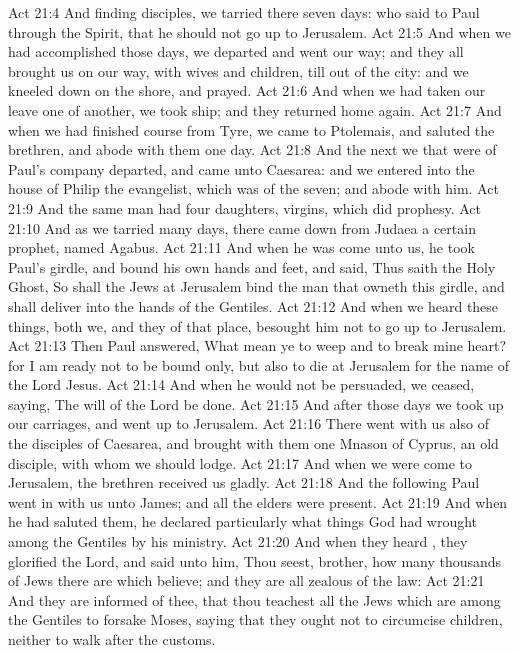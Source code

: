 \vs Act 21:4 And finding disciples, we tarried there seven days: who said to Paul through the Spirit, that he should not go up to Jerusalem.
\vs Act 21:5 And when we had accomplished those days, we departed and went our way; and they all brought us on our way, with wives and children, till  out of the city: and we kneeled down on the shore, and prayed.
\vs Act 21:6 And when we had taken our leave one of another, we took ship; and they returned home again.
\vs Act 21:7 And when we had finished  course from Tyre, we came to Ptolemais, and saluted the brethren, and abode with them one day.
\vs Act 21:8 And the next  we that were of Paul's company departed, and came unto Caesarea: and we entered into the house of Philip the evangelist, which was  of the seven; and abode with him.
\vs Act 21:9 And the same man had four daughters, virgins, which did prophesy.
\vs Act 21:10 And as we tarried  many days, there came down from Judaea a certain prophet, named Agabus.
\vs Act 21:11 And when he was come unto us, he took Paul's girdle, and bound his own hands and feet, and said, Thus saith the Holy Ghost, So shall the Jews at Jerusalem bind the man that owneth this girdle, and shall deliver  into the hands of the Gentiles.
\vs Act 21:12 And when we heard these things, both we, and they of that place, besought him not to go up to Jerusalem.
\vs Act 21:13 Then Paul answered, What mean ye to weep and to break mine heart? for I am ready not to be bound only, but also to die at Jerusalem for the name of the Lord Jesus.
\vs Act 21:14 And when he would not be persuaded, we ceased, saying, The will of the Lord be done.
\vs Act 21:15 And after those days we took up our carriages, and went up to Jerusalem.
\vs Act 21:16 There went with us also  of the disciples of Caesarea, and brought with them one Mnason of Cyprus, an old disciple, with whom we should lodge.
\vs Act 21:17 And when we were come to Jerusalem, the brethren received us gladly.
\vs Act 21:18 And the  following Paul went in with us unto James; and all the elders were present.
\vs Act 21:19 And when he had saluted them, he declared particularly what things God had wrought among the Gentiles by his ministry.
\vs Act 21:20 And when they heard , they glorified the Lord, and said unto him, Thou seest, brother, how many thousands of Jews there are which believe; and they are all zealous of the law:
\vs Act 21:21 And they are informed of thee, that thou teachest all the Jews which are among the Gentiles to forsake Moses, saying that they ought not to circumcise  children, neither to walk after the customs.
